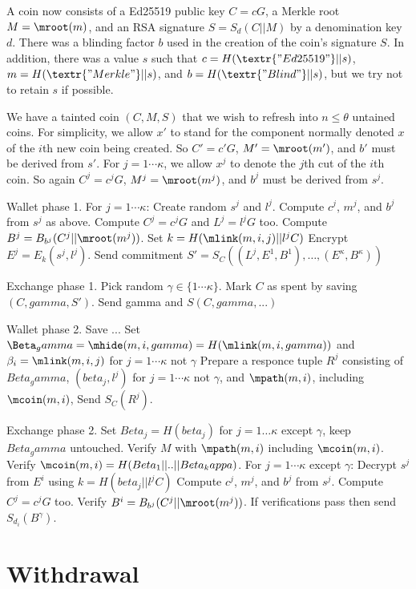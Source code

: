 \documentclass{llncs}
\begin{document}
A coin now consists of 
  a Ed25519 public key $C = c G$,
  a Merkle root $M = \mroot(m)$, and 
  an RSA signature $S = S_d(C || M)$ by a denomination key $d$.
There was a blinding factor $b$ used in the creation of the coin's signature $S$.
In addition, there was a value $s$ such that 
  $c = H(\textr{"Ed25519"} || s)$,
  $m = H(\textr{"Merkle"} || s)$, and
  $b = H(\textr{"Blind"} || s)$,
but we try not to retain $s$ if possible.


We have a tainted coin $(C,M,S)$ that we wish to
 refresh into $n \le \theta$ untained coins.  
For simplicity, we allow $x'$ to stand for the component
 normally denoted $x$ of the $i$th new coin being created.  
So $C' = c' G$, $M' = \mroot(m')$, and $b'$ must be derived from $s'$.
For $j=1\cdots\kappa$,
 we allow $x^j$ to denote the $j$th cut of the $i$th coin.  
So again
 $C^j = c^j G$, $M^j = \mroot(m^j)$, and $b^j$ must be derived from $s^j$.

Wallet phase 1.
  For $j=1 \cdots \kappa$:
    Create random $s^j$ and $l^j$.
    Compute $c^j$, $m^j$, and $b^j$ from $s^j$ as above.
    Compute $C^j = c^j G$ and $L^j = l^j G$ too.
    Compute $B^j = B_{b^j}(C^j || \mroot(m^j))$.
    Set $k = H(\mlink(m,i,j) || l^j C)$
    Encrypt $E^j = E_k(s^j,l^j)$.
  Send commitment $S' = S_C( (L^j,E^1,B^1), \ldots, (E^\kappa,B^\kappa) )$

Exchange phase 1.
  Pick random $\gamma \in \{1 \cdots \kappa\}$.
  Mark $C$ as spent by saving $(C,gamma,S')$.
  Send gamma and $S(C,gamma,...)$

Wallet phase 2.
  Save ...
  Set $\Beta_gamma = \mhide(m,i,gamma) = H( \mlink(m,i,gamma) )$ and
      $\beta_i = \mlink(m,i,j)$ for $j=1\cdots\kappa$ not $\gamma$
  Prepare a responce tuple $R^j$ consisting of 
    $Beta_gamma$,  $(beta_j,l^j)$ for $j=1\cdots\kappa$ not $\gamma$,  
    and  $\mpath(m,i)$, including $\mcoin(m,i)$,
  Send $S_C(R^j)$.

Exchange phase 2.
  Set $Beta_j = H(beta_j)$ for $j=1\ldots\kappa$ except $\gamma$,
    keep $Beta_gamma$ untouched.
  Verify $M$ with $\mpath(m,i)$ including $\mcoin(m,i)$.
  Verify $\mcoin(m,i) = H( Beta_1 || .. || Beta_kappa )$.
  For $j=1 \cdots \kappa$ except $\gamma$:
    Decrypt $s^j$ from $E^i$ using $k = H(beta_j || l^j C)$
    Compute $c^j$, $m^j$, and $b^j$ from $s^j$.
    Compute $C^j = c^j G$ too.
    Verify $B^i = B_{b^j}(C^j || \mroot(m^j))$.
  If verifications pass then send $S_{d_i}(B^\gamma)$.


\section{Withdrawal}






\end{document}
